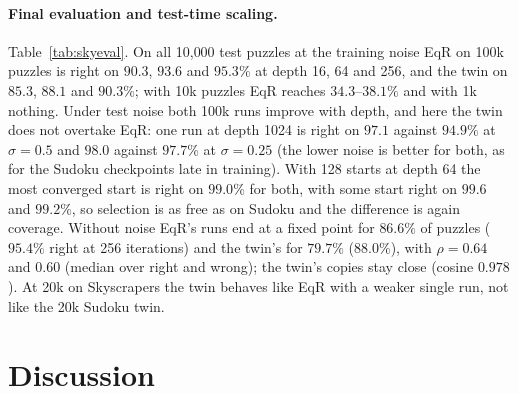 \documentclass[11pt]{article}
\theoremstyle{definition}
\begin{document}
\paragraph{Final evaluation and test-time scaling.} Table~\ref{tab:skyeval}. On all 10{,}000 test puzzles at the training noise EqR on 100k
puzzles is right on $90.3$, $93.6$ and $95.3\%$ at depth 16, 64 and 256, and the twin on $85.3$, $88.1$ and $90.3\%$; with 10k puzzles EqR
reaches $34.3$--$38.1\%$ and with 1k nothing. Under test noise both 100k runs improve with depth, and here the twin does not overtake EqR:
one run at depth 1024 is right on $97.1$ against $94.9\%$ at $\sigma=0.5$ and $98.0$ against $97.7\%$ at $\sigma=0.25$ (the lower noise is
better for both, as for the Sudoku checkpoints late in training). With 128 starts at depth 64 the most converged start is right on $99.0\%$
for both, with some start right on $99.6$ and $99.2\%$, so selection is as free as on Sudoku and the difference is again coverage. Without
noise EqR's runs end at a fixed point for $86.6\%$ of puzzles ($95.4\%$ right at 256 iterations) and the twin's for $79.7\%$ ($88.0\%$), with
$\rho=0.64$ and $0.60$ (median over right and wrong); the twin's copies stay close (cosine $0.978$). At 20k on Skyscrapers the twin behaves
like EqR with a weaker single run, not like the 20k Sudoku twin.

\section{Discussion}
\end{document}
